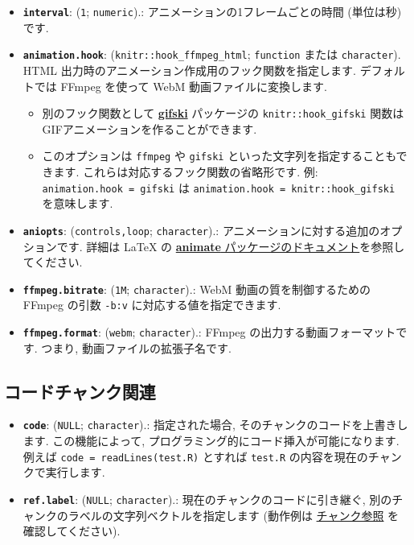 \documentclass[
]{bxjsreport}
\providecommand{\tightlist}{%
  \setlength{\itemsep}{0pt}\setlength{\parskip}{0pt}}
\begin{document}
\begin{itemize}
\tightlist
\item
  \textbf{\texttt{interval}}: (\texttt{1}; \texttt{numeric}).:
  アニメーションの1フレームごとの時間 (単位は秒) です.
\item
  \textbf{\texttt{animation.hook}}: (\texttt{knitr::hook\_ffmpeg\_html};
  \texttt{function} または \texttt{character}). HTML
  出力時のアニメーション作成用のフック関数を指定します. デフォルトでは
  FFmpeg を使って WebM 動画ファイルに変換します.

  \begin{itemize}
  \tightlist
  \item
    別のフック関数として
    \href{https://cran.r-project.org/package=gifski}{\textbf{gifski}}
    パッケージの \texttt{knitr::hook\_gifski}
    関数はGIFアニメーションを作ることができます.
  \item
    このオプションは \texttt{\textquotesingle{}ffmpeg\textquotesingle{}}
    や \texttt{\textquotesingle{}gifski\textquotesingle{}}
    といった文字列を指定することもできます.
    これらは対応するフック関数の省略形です. 例:
    \texttt{animation.hook\ =\ \textquotesingle{}gifski\textquotesingle{}}
    は \texttt{animation.hook\ =\ knitr::hook\_gifski} を意味します.
  \end{itemize}
\item
  \textbf{\texttt{aniopts}}:
  (\texttt{\textquotesingle{}controls,loop\textquotesingle{}};
  \texttt{character}).: アニメーションに対する追加のオプションです.
  詳細は LaTeX の \href{http://ctan.org/pkg/animate}{\textbf{animate}
  パッケージのドキュメント}を参照してください.
\item
  \textbf{\texttt{ffmpeg.bitrate}}: (\texttt{1M}; \texttt{character}).:
  WebM 動画の質を制御するための FFmpeg の引数 \texttt{-b:v}
  に対応する値を指定できます.
\item
  \textbf{\texttt{ffmpeg.format}}: (\texttt{webm}; \texttt{character}).:
  FFmpeg の出力する動画フォーマットです. つまり,
  動画ファイルの拡張子名です.
\end{itemize}

\hypertarget{code-chunk}{%
\subsection{コードチャンク関連}\label{code-chunk}}

\begin{itemize}
\tightlist
\item
  \textbf{\texttt{code}}: (\texttt{NULL}; \texttt{character}).:
  指定された場合, そのチャンクのコードを上書きします. この機能によって,
  プログラミング的にコード挿入が可能になります. 例えば
  \texttt{code\ =\ readLines(\textquotesingle{}test.R\textquotesingle{})}
  とすれば \texttt{test.R} の内容を現在のチャンクで実行します.
\item
  \textbf{\texttt{ref.label}}: (\texttt{NULL}; \texttt{character}).:
  現在のチャンクのコードに引き継ぐ,
  別のチャンクのラベルの文字列ベクトルを指定します (動作例は
  \protect\hyperlink{reference}{チャンク参照} を確認してください).
\end{itemize}
\end{document}
